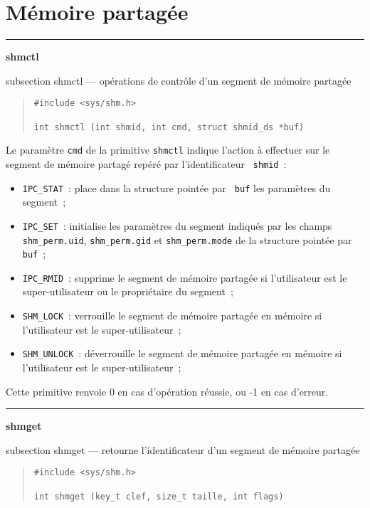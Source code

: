 \documentclass [twoside] {report}
\newcommand {\primitive} [1]
    {
	{\large \bf #1}
	\addcontentsline {toc} {subsection} {#1}
    }
\newcommand {\separation}
    {
	\vspace {7mm}
	\nopagebreak
	\hrule
    }
\begin{document}
\section* {Mémoire partagée}

\separation
\primitive {shmctl} --- opérations de contrôle d'un segment de mémoire partagée

\begin {quote}
\begin {verbatim}
#include <sys/shm.h>

int shmctl (int shmid, int cmd, struct shmid_ds *buf)
\end{verbatim}
\end {quote}

Le paramètre {\tt cmd} de la primitive {\tt shmctl} indique l'action à
effectuer sur le segment de mémoire partagé repéré par l'identificateur {\tt
shmid}~:

\begin {itemize}
    \item {\tt IPC\_STAT}~:  place dans la structure pointée par {\tt
	buf} les paramètres du segment~;
    \item {\tt IPC\_SET}~:  initialise les paramètres du segment
	indiqués par les champs {\tt shm\_perm.uid}, {\tt shm\_perm.gid}
	et {\tt shm\_perm.mode} de la structure pointée par {\tt buf}~;
    \item {\tt IPC\_RMID}~:  supprime le segment de mémoire partagée si
	l'utilisateur est le super-utilisateur ou le propriétaire du
	segment~;
    \item {\tt SHM\_LOCK}~:  verrouille le segment de mémoire partagée
	en mémoire si l'utilisateur est le super-utilisateur~;
    \item {\tt SHM\_UNLOCK}~:  déverrouille le segment de mémoire
	partagée en mémoire si l'utilisateur est le super-utilisateur~;
\end {itemize}

Cette primitive renvoie 0 en cas d'opération
réussie, ou -1 en cas d'erreur.



\separation
\primitive {shmget} --- retourne l'identificateur d'un segment de mémoire partagée

\begin {quote}
\begin {verbatim}
#include <sys/shm.h>

int shmget (key_t clef, size_t taille, int flags)
\end{verbatim}
\end {quote}
\end{document}
